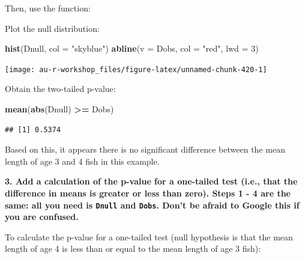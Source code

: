 \documentclass[]{book}
\newenvironment{Shaded}{\begin{snugshade}}{\end{snugshade}}
\newcommand{\KeywordTok}[1]{\textcolor[rgb]{0.13,0.29,0.53}{\textbf{#1}}}
\newcommand{\DataTypeTok}[1]{\textcolor[rgb]{0.13,0.29,0.53}{#1}}
\newcommand{\DecValTok}[1]{\textcolor[rgb]{0.00,0.00,0.81}{#1}}
\newcommand{\StringTok}[1]{\textcolor[rgb]{0.31,0.60,0.02}{#1}}
\newcommand{\OperatorTok}[1]{\textcolor[rgb]{0.81,0.36,0.00}{\textbf{#1}}}
\newcommand{\NormalTok}[1]{#1}
\theoremstyle{definition}
\theoremstyle{definition}
\theoremstyle{definition}
\theoremstyle{remark}
\begin{document}
Then, use the function:

\begin{Shaded}
\end{Shaded}

Plot the null distribution:

\begin{Shaded}
\begin{Highlighting}[]
\KeywordTok{hist}\NormalTok{(Dnull, }\DataTypeTok{col =} \StringTok{"skyblue"}\NormalTok{)}
\KeywordTok{abline}\NormalTok{(}\DataTypeTok{v =}\NormalTok{ Dobs, }\DataTypeTok{col =} \StringTok{"red"}\NormalTok{, }\DataTypeTok{lwd =} \DecValTok{3}\NormalTok{)}
\end{Highlighting}
\end{Shaded}

\begin{center}\texttt{[image: au-r-workshop\_files/figure-latex/unnamed-chunk-420-1]} \end{center}

Obtain the two-tailed p-value:

\begin{Shaded}
\begin{Highlighting}[]
\KeywordTok{mean}\NormalTok{(}\KeywordTok{abs}\NormalTok{(Dnull) }\OperatorTok{>=}\StringTok{ }\NormalTok{Dobs)}
\end{Highlighting}
\end{Shaded}

\begin{verbatim}
## [1] 0.5374
\end{verbatim}

Based on this, it appears there is no significant difference between the
mean length of age 3 and 4 fish in this example.

\textbf{3. Add a calculation of the p-value for a one-tailed test (i.e.,
that the difference in means is greater or less than zero). Steps 1 - 4
are the same: all you need is \texttt{Dnull} and \texttt{Dobs}. Don't be
afraid to Google this if you are confused.}

To calculate the p-value for a one-tailed test (null hypothesis is that
the mean length of age 4 is less than or equal to the mean length of age
3 fish):
\end{document}
